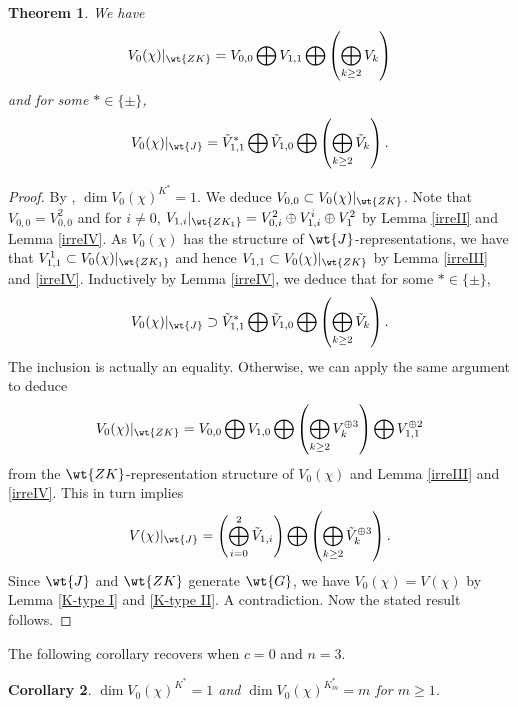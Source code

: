 \documentclass[11pt,reqno]{amsart}
\theoremstyle{plain}
\newtheorem{thm}{Theorem}[section] \newtheorem{cor}[thm]{Corollary}
\theoremstyle{remark} \newtheorem{remark}[thm]{Remark}
\theoremstyle{definition} \newtheorem{exercise}[thm]{Exercise}
\theoremstyle{definition} \newtheorem{example}[thm]{Example} \newtheorem{condition}[thm]{Condition}
\numberwithin{equation}{section}
\renewcommand{\-}{\text{--}}
\begin{document}
\begin{thm}\label{K-type} 
We have
\[V_0(\chi)|_{\wt{ZK}}=V_{0,0}\bigoplus V_{1,1}\bigoplus \left(\bigoplus_{k\geq 2}V_k\right)\]
and for some $*\in\{\pm\}$, \[V_0(\chi)|_{\wt{J}}=\tilde{V}_{1,1}^*\bigoplus \tilde{V}_{1,0}\bigoplus \left(\bigoplus_{k\geq2}\tilde{V}_k\right).\]
\end{thm}
\begin{proof} By \cite[Theorem I.2.9(e)]{KP84}, $\dim V_0(\chi)^{K^*}=1$. We deduce $V_{0,0}\subset V_0(\chi)|_{\wt{ZK}}$. Note that $V_{0,0}=V_{0,0}^2$ and for $i\neq0$, $V_{1,i}|_{\wt{ZK_1}}=V_{0,i}^2\oplus V_{1,i}^i\oplus V_{1}^2$ by Lemma \ref{irreII} and Lemma \ref{irreIV}. As $V_0(\chi)$ has the structure of $\wt{J}$-representations, we have that $V_{1,1}^1\subset V_0(\chi)|_{\wt{ZK_1}}$ and hence $V_{1,1}\subset V_0(\chi)|_{\wt{ZK}}$ by Lemma \ref{irreIII} and \ref{irreIV}. Inductively by Lemma \ref{irreIV}, we deduce that for some $*\in\{\pm\}$, 
\[V_0(\chi)|_{\wt{J}}\supset \tilde{V}_{1,1}^*\bigoplus \tilde{V}_{1,0}\bigoplus \left(\bigoplus_{k\geq2}\tilde{V}_k\right).\]
The inclusion is actually an equality. Otherwise, we can apply the same argument to deduce 
\[V_0(\chi)|_{\wt{ZK}}=V_{0,0}\bigoplus V_{1,0}\bigoplus \left(\bigoplus_{k\geq2}V_k^{\oplus 3}\right)\bigoplus V_{1,1}^{\oplus2}\] 
from the $\wt{ZK}$-representation structure of $V_0(\chi)$ and  Lemma \ref{irreIII} and \ref{irreIV}. This in turn implies  
\[V(\chi)|_{\wt{J}}=\left(\bigoplus_{i=0}^{2} \tilde{V}_{1,i}\right)\bigoplus \left(\bigoplus_{k\geq2}\tilde{V}_k^{\oplus 3}\right).\] 
Since $\wt{J}$ and $\wt{ZK}$ generate $\wt{G}$, we have $V_0(\chi)=V(\chi)$ by Lemma \ref{K-type I} and \ref{K-type II}. A contradiction. 
Now the stated result follows.
\end{proof}
The following corollary  recovers \cite[Theorem 4.1]{Pat98} when $c=0$ and $n=3$.
\begin{cor} $\dim V_0(\chi)^{K^*}=1$ and
$\dim V_0(\chi)^{K_m^*}=m$ for $m\geq1$.
\end{cor}
\end{document}
